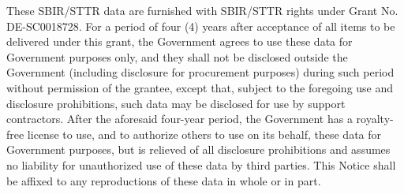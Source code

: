 



These SBIR/STTR data are furnished with SBIR/STTR rights under Grant
No. DE-SC0018728. For a period of four (4) years after acceptance of all items to be
delivered under this grant, the Government agrees to use these data
for Government purposes only, and they shall not be disclosed outside
the Government (including disclosure for procurement purposes) during
such period without permission of the grantee, except that, subject to
the foregoing use and disclosure prohibitions, such data may be
disclosed for use by support contractors.  After the aforesaid
four-year period, the Government has a royalty-free license to use,
and to authorize others to use on its behalf, these data for
Government purposes, but is relieved of all disclosure prohibitions
and assumes no liability for unauthorized use of these data by third
parties.  This Notice shall be affixed to any reproductions of these
data in whole or in part.

